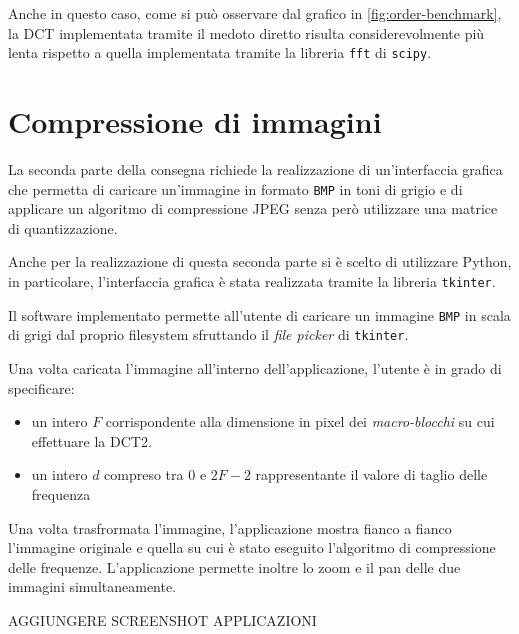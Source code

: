 \documentclass[a4paper, 12pt]{article}
\begin{document}
Anche in questo caso, come si può osservare dal grafico in
\ref{fig:order-benchmark}, la DCT implementata tramite il medoto diretto risulta
considerevolmente più lenta rispetto a quella implementata tramite la libreria
\texttt{fft} di \texttt{scipy}.


\section{Compressione di immagini}
La seconda parte della consegna richiede la realizzazione di un'interfaccia
grafica che permetta di caricare un'immagine in formato \texttt{BMP} in toni di
grigio e di applicare un algoritmo di compressione JPEG senza però utilizzare una
matrice di quantizzazione.

Anche per la realizzazione di questa seconda parte si è scelto di utilizzare
Python, in particolare, l'interfaccia grafica è stata realizzata tramite la
libreria \texttt{tkinter}.

Il software implementato permette all'utente di caricare un immagine
\texttt{BMP} in scala di grigi dal proprio filesystem sfruttando il \textit{file
  picker} di \texttt{tkinter}.

Una volta caricata l'immagine all'interno dell'applicazione, l'utente è in grado
di specificare:

\begin{itemize}
  \item un intero $F$ corrispondente alla dimensione in pixel dei
        \textit{macro-blocchi} su cui effettuare la DCT2.
  \item un intero $d$ compreso tra $0$ e $2F - 2$ rappresentante il valore di
        taglio delle frequenza
\end{itemize}

Una volta trasfrormata l'immagine, l'applicazione mostra fianco a fianco
l'immagine originale e quella su cui è stato eseguito l'algoritmo di
compressione delle frequenze. L'applicazione permette inoltre lo zoom e il pan
delle due immagini simultaneamente.

\textsc{AGGIUNGERE SCREENSHOT APPLICAZIONI}
\end{document}
